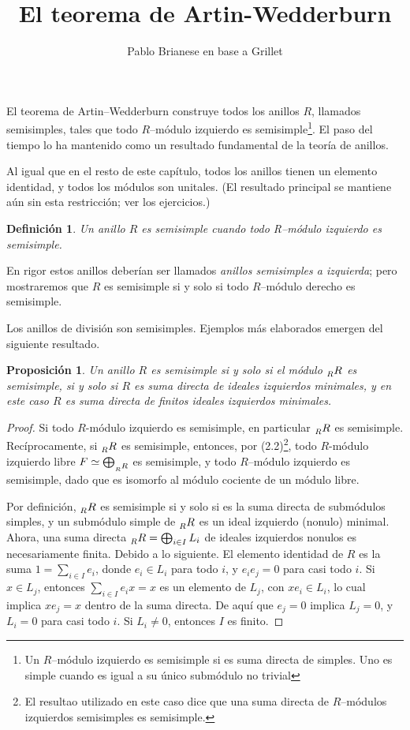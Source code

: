 \documentclass{article}
\title{El teorema de Artin-Wedderburn}
\author{Pablo Brianese en base a Grillet}
\newtheorem{definition}{Definición}[section]
\newtheorem{proposition}{Proposición}[section]
\begin{document}
\maketitle


El teorema de Artin--Wedderburn construye todos los anillos $R$, llamados semisimples, tales que todo $R$--módulo izquierdo es semisimple\footnote{Un $R$--módulo izquierdo es semisimple si es suma directa de simples. Uno es simple cuando es igual a su único submódulo no trivial}. El paso del tiempo lo ha mantenido como un resultado fundamental de la teoría de anillos.

Al igual que en el resto de este capítulo, todos los anillos tienen un elemento identidad, y todos los módulos son unitales. (El resultado principal se mantiene aún sin esta restricción; ver los ejercicios.)

\begin{definition}
    Un anillo $R$ es \emph{semisimple} cuando todo R--módulo izquierdo es semisimple.
\end{definition}

En rigor estos anillos deberían ser llamados \emph{anillos semisimples a izquierda}; pero mostraremos que $R$ es semisimple si y solo si todo $R$--módulo derecho es semisimple.

Los anillos de división son semisimples. Ejemplos más elaborados emergen del siguiente resultado.

\begin{proposition}
    Un anillo $R$ es semisimple si y solo si el módulo \(\prescript{}{R}{R}\) es semisimple, si y solo si $R$ es suma directa de ideales izquierdos minimales, y en este caso $R$ es suma directa de finitos ideales izquierdos minimales.
\end{proposition}

\begin{proof}
    Si todo \(R\)-módulo izquierdo es semisimple, en particular \(\prescript{}{R}{R}\) es semisimple. Recíprocamente, si \(\prescript{}{R}{R}\) es semisimple, entonces, por (2.2)\footnote{El resultao utilizado en este caso dice que una suma directa de $R$--módulos izquierdos semisimples es semisimple.}, todo \(R\)-módulo izquierdo libre \(F \simeq \bigoplus_{\prescript{}{R}{R}}\) es semisimple, y todo $R$--módulo izquierdo es semisimple, dado que es isomorfo al módulo cociente de un módulo libre.

    Por definición, \(\prescript{}{R}{R}\) es semisimple si y solo si es la suma directa de submódulos simples, y un submódulo simple de \(\prescript{}{R}{R}\) es un ideal izquierdo (nonulo) minimal. Ahora, una suma directa \(\prescript{}{R}{R} = \bigoplus_{i \in I} L_i\) de ideales izquierdos nonulos es necesariamente finita. Debido a lo siguiente. El elemento identidad de $R$ es la suma $1 = \sum_{i \in I} e_i$, donde $e_i \in L_i$ para todo $i$, y $e_i e_j = 0$ para casi todo $i$. Si $x \in L_j$, entonces $\sum_{i \in I} e_i x = x$ es un elemento de $L_j$, con $x e_i \in L_i$, lo cual implica $ x e_j = x$ dentro de la suma directa. De aquí que $e_j = 0$ implica $L_j = 0$, y $L_i = 0$ para casi todo $i$. Si $L_i \neq 0$, entonces $I$ es finito.
\end{proof}
\end{document}

